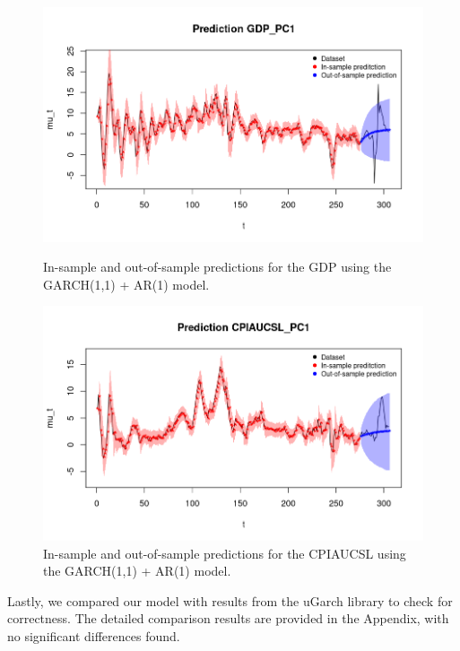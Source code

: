 \begin{figure}[H]
    \centering
    \begin{minipage}{0.49\textwidth}
        \centering
        \includegraphics[width=\textwidth]{images/5-GARCH/gdp_prediction.png}
        \caption{In-sample and out-of-sample predictions for the GDP using the GARCH(1,1) + AR(1) model.}
        \label{fig:GARCH1,1_AR1_gdp_prediction} 
    \end{minipage}\hfill
    \begin{minipage}{0.49\textwidth}
        \centering
        \includegraphics[width=\textwidth]{images/5-GARCH/infl_prediction.png}
        \caption{In-sample and out-of-sample predictions for the CPIAUCSL using the GARCH(1,1) + AR(1) model.}
        \label{fig:GARCH1,1_AR1_infl_prediction}
    \end{minipage}
\end{figure}
Lastly, we compared our model with results from the uGarch library to check for correctness. The detailed comparison results are provided in the Appendix, with no significant differences found. \\